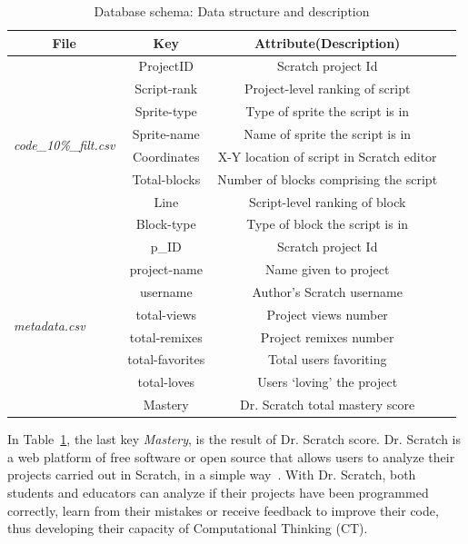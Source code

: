 \documentclass[a4paper,twocolumn,10pt]{article}
\begin{document}
\begin{table}
  \centering\renewcommand{\arraystretch}{1.2}
   \begin{tabular}{@{}lccc@{}}
    \toprule
    \multicolumn{1}{c}{\textbf{File}} & \textbf{Key} &\textbf{Attribute(Description)} \\
    \midrule
    \multirow{8}{*}{\textit{code\_10\%\_filt.csv}} & ProjectID & Scratch project Id \\
                & Script-rank & Project-level ranking of script \\
                & Sprite-type & Type of sprite the script is in\\
                & Sprite-name & Name of sprite the script is in\\
                & Coordinates & X-Y location of script in Scratch editor\\
                & Total-blocks & Number of blocks comprising the script \\
                & Line & Script-level ranking of block \\
                & Block-type & Type of block the script is in\\
    \hline
    \multirow{8}{*}{\textit{metadata.csv}} & p\_ID & Scratch project Id \\
                & project-name & Name given to project \\
                & username & Author’s Scratch username\\
                & total-views & Project views number \\
                & total-remixes & Project remixes number \\
                & total-favorites & Total users favoriting \\
                & total-loves & Users ‘loving’ the project \\
                & Mastery & Dr. Scratch total mastery score\\
    \bottomrule
    \end{tabular}
    \caption{Database schema: Data structure and description}
    \label{tab:schema}
\end{table}


In Table~\ref{tab:schema}, the last key \textit{Mastery}, is the result of Dr. Scratch
score. Dr. Scratch is a web platform of free software or open source that 
allows users to analyze their projects carried out in Scratch, in a simple
way~\cite{moreno2015dr}. With Dr. Scratch, both students and educators can analyze if their
projects have been programmed correctly, learn from their mistakes or
receive feedback to improve their code, thus developing their capacity of
Computational Thinking (CT).
\end{document}
